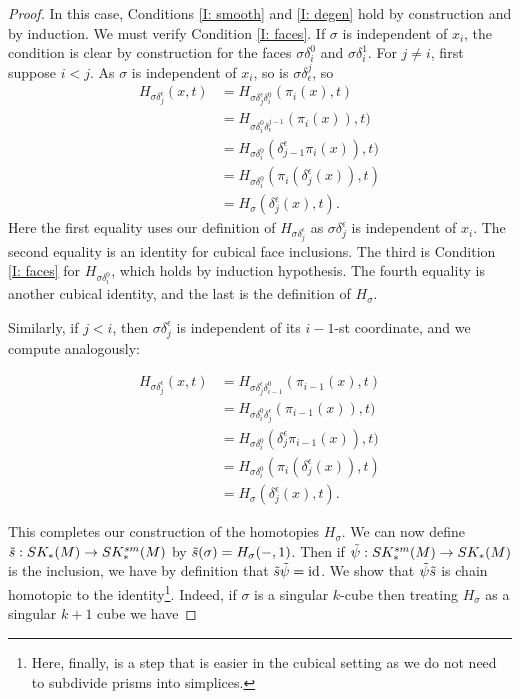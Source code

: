 \begin{proof}
In this case, Conditions \eqref{I: smooth} and \eqref{I: degen} hold by construction and by induction. We must verify Condition \eqref{I: faces}. If $\sigma$ is independent of $x_i$, the condition is clear by construction for the faces $\sigma\delta_i^0$ and $\sigma\delta_i^1$. For $j\neq i$, first suppose $i<j$. As $\sigma$ is independent of $x_i$, so is $\sigma\delta^j_\epsilon$, so
\begin{align*}
H_{\sigma\delta_j^\epsilon}(x,t)& = H_{\sigma\delta_j^\epsilon \delta_i^0}(\pi_i(x),t)\\
& = H_{\sigma \delta_i^0\delta^{j-1}_\epsilon}(\pi_i(x)),t)\\
& = H_{\sigma \delta_i^0}(\delta_{j-1}^\epsilon\pi_i(x)),t)\\
& = H_{\sigma \delta_i^0}(\pi_i(\delta_j^\epsilon(x)),t)\\
& = H_\sigma(\delta_j^\epsilon(x),t).
\end{align*}
Here the first equality uses our definition of $H_{\sigma\delta_j^\epsilon}$ as $\sigma\delta_j^\epsilon$ is independent of $x_i$. The second equality is an identity for cubical face inclusions. The third is Condition \eqref{I: faces} for $H_{\sigma \delta_i^0}$, which holds by induction hypothesis. The fourth equality is another cubical identity, and the last is the definition of $H_\sigma$.

Similarly, if $j<i$, then $\sigma\delta_j^\epsilon$ is independent of its $i-1$-st coordinate, and we compute analogously:

\begin{align*}
H_{\sigma\delta_j^\epsilon}(x,t)& = H_{\sigma\delta_j^\epsilon \delta_{i-1}^0}(\pi_{i-1}(x),t)\\
& = H_{\sigma \delta_{i}^0\delta_{j}^\epsilon}(\pi_{i-1}(x)),t)\\
& = H_{\sigma \delta_{i}^0}(\delta_{j}^\epsilon\pi_{i-1}(x)),t)\\
& = H_{\sigma \delta_{i}^0}(\pi_{i}(\delta_j^\epsilon(x)),t)\\
& = H_\sigma(\delta_j^\epsilon(x),t).
\end{align*}

This completes our construction of the homotopies $H_\sigma$. We can now define $\tilde s:SK_*(M) \to SK^{sm}_*(M)$ by $\tilde s(\sigma) = H_\sigma(-,1)$. Then if $\tilde \psi: SK_*^{sm}(M) \to SK_*(M)$ is the inclusion, we have by definition that $\tilde s \tilde \psi = \mathrm{id}$. We show that $\tilde\psi\tilde s$ is chain homotopic to the identity\footnote{Here, finally, is a step that is easier in the cubical setting as we do not need to subdivide prisms into simplices.}. Indeed, if $\sigma$ is a singular $k$-cube then treating $H_\sigma$ as a singular $k+1$ cube we have


\end{proof}
